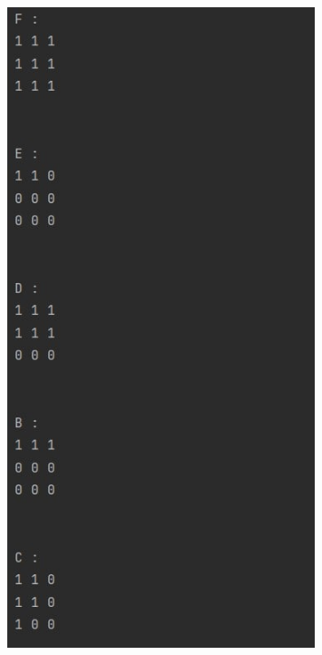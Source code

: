 \documentclass[bachelor, och, labwork]{shiza}
\begin{document}
        \begin{figure}[H]
            \centering
            \includegraphics[width=0.8\textwidth]{pic/3.jpg}
            \caption{}
        \end{figure}
\end{document}
